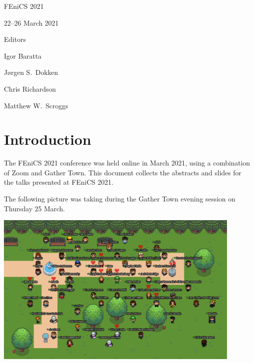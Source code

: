 \thispagestyle{empty}

\setcounter{page}{0}
\vspace*{6cm}
\begin{center}
\setmainfont[Scale=6]{Lato Bold}
FEniCS 2021
\end{center}
\begin{center}
\setmainfont[Scale=4]{Lato Bold}
22--26 March 2021
\end{center}

\vspace{8cm}

\begin{center}
\setmainfont[Scale=2]{Lato Bold}
Editors
\end{center}
\begin{center}
\setmainfont[Scale=1.3]{Lato}
Igor Baratta
\end{center}
\begin{center}
\setmainfont[Scale=1.3]{Lato}
J{\o}rgen S.~Dokken
\end{center}
\begin{center}
\setmainfont[Scale=1.3]{Lato}
Chris Richardson
\end{center}
\begin{center}
\setmainfont[Scale=1.3]{Lato}
Matthew W.~Scroggs
\end{center}


\tableofcontents


\chapter*{Introduction}
\setcounter{page}{1}

The FEniCS 2021 conference was held online in March 2021, using a combination of Zoom and Gather Town.
This document collects the abstracts and slides for the talks presented at FEniCS 2021.

The following picture was taking during the Gather Town evening session on Thursday 25 March.

\begin{center}
\includegraphics[width=0.9\textwidth]{../files/img/small-photo.png}
\end{center}

